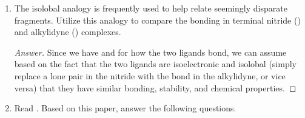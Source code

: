 \documentclass[../psets.tex]{subfiles}
\begin{document}
\begin{enumerate}
    \begin{enumerate}[label={\alph*)}]
        \item Low spin (II) or high spin (II).
        \begin{proof}[Answer]
            High spin (II) has a larger radius than low spin (II) because the $e_g$ orbitals are antibonding, so having more antibonding electrons both pushes the bounds of the atom (increasing the atomic radius) and weakens bonds (increasing the covalent radius).
        \end{proof}
        \item {}(II) or (III).
        \begin{proof}[Answer]
            (II) has a larger radius than (III) because having more electrons means more intra-orbital repulsions, all of which push the bounds of the atom.
        \end{proof}
        \item Low spin (II) or high spin (II).
        \begin{proof}[Answer]
            The radius is the same (low spin equals high spin for $d^2$ complexes).
        \end{proof}
        \item {}(IV) or (III).
        \begin{proof}[Answer]
            (III) has a larger radius than (IV) for the same reasons listed in part (b).
        \end{proof}
    \end{enumerate}
    \item The isolobal analogy is frequently used to help relate seemingly disparate fragments. Utilize this analogy to compare the bonding in terminal nitride () and alkylidyne () complexes.
    \begin{proof}[Answer]
        Since we have \quad and  for how the two ligands bond, we can assume based on the fact that the two ligands are isoelectronic and isolobal (simply replace a lone pair in the nitride with the bond in the alkylidyne, or vice versa) that they have similar bonding, stability, and chemical properties.
    \end{proof}
    \item Read \textcite{bib:CBC}. Based on this paper, answer the following questions.
    \begin{enumerate}[label={\alph*)}]

\end{enumerate}
\end{enumerate}
\end{document}
